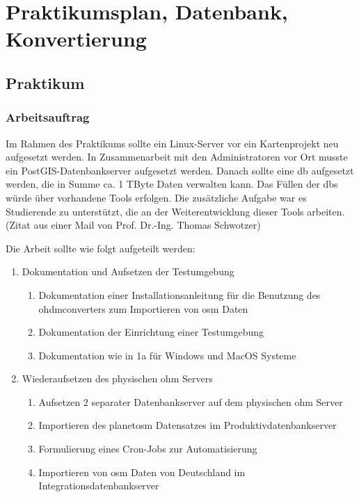 \renewcommand*{\chaptermarkformat}{\chapapp~\thechapter:~}
 \chead{} \ohead{\headmark}
  
\part{Praktikumsplan, Datenbank, Konvertierung}
\chapter{Praktikum}
\section{Arbeitsauftrag}\label{sec:workorder}
Im Rahmen des Praktikums sollte ein Linux-Server vor ein Kartenprojekt neu
aufgesetzt werden. In Zusammenarbeit mit den Administratoren vor Ort musste ein
PostGIS-Datenbankserver aufgesetzt werden. Danach sollte eine \gls{db} aufgesetzt werden, die in Summe ca. 1 TByte Daten verwalten kann. Das Füllen der \gls{db}s würde über vorhandene Tools erfolgen. Die zusätzliche Aufgabe war es Studierende zu unterstützt, die an der Weiterentwicklung dieser Tools arbeiten. (Zitat aus einer Mail von Prof. Dr.-Ing. Thomas Schwotzer)

Die Arbeit sollte wie folgt aufgeteilt werden:
\begin{enumerate}
	\item Dokumentation und Aufsetzen der Testumgebung
	\begin{enumerate}
		\item Dokumentation einer Installationsanleitung für die Benutzung des \newline \gls{ohdmconverter}s zum Importieren von \gls{osm} Daten
		\item Dokumentation der Einrichtung einer Testumgebung
		\item Dokumentation wie in 1a für Windows und MacOS Systeme
	\end{enumerate}
	\item Wiederaufsetzen des physischen \gls{ohm} Servers
	\begin{enumerate}
		\item Aufsetzen 2 separater Datenbankserver auf dem physischen \gls{ohm} Server\label{item:sep-db}
		\item Importieren des \gls{planetosm}\cite{planet-osm} Datensatzes im Produktivdatenbankserver
		\item Formulierung eines Cron-Jobs zur Automatisierung
		\item Importieren von \gls{osm} Daten von Deutschland im Integrationsdatenbankserver
	\end{enumerate}
\end{enumerate}

